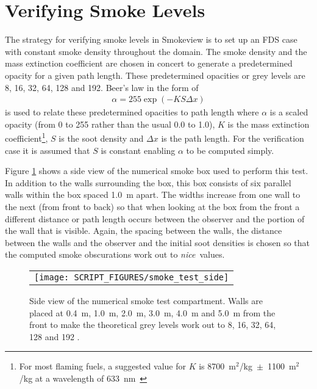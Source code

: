 \documentclass[11pt,twoside]{book}
\newcommand{\figoptions}{hbp}
\begin{document}
\section{Verifying Smoke Levels}
The strategy for verifying smoke levels in Smokeview is to set up an FDS case with constant smoke density throughout the domain.  The smoke density and the mass extinction coefficient are chosen in concert to generate a predetermined opacity for a given path length.   These predetermined opacities or grey levels are 8, 16, 32, 64, 128 and 192.  Beer's law in the form of
\begin{eqnarray*}
\alpha = 255\exp(-KS\Delta x)
\end{eqnarray*}
is used to relate these predetermined opacities to path length where $\alpha$ is a scaled opacity (from 0 to 255 rather than the usual 0.0 to 1.0),
$K$ is the mass extinction coefficient\footnote{For most flaming fuels, a suggested value for $K$ is
8700~m$^2$/kg~$\pm$~1100~m$^2$/kg at a
wavelength of 633~nm~\cite{Mulholland:F+M}},
$S$ is the soot density and $\Delta x$ is the path length.  For the verification case it is assumed that $S$ is constant enabling $\alpha$ to be computed simply.

Figure \ref{figsmoketestgeom} shows a side view of the numerical smoke box used to perform this test.  In addition to the walls surrounding the box, this box consists of  six parallel walls within the box spaced 1.0~m apart.  The widths increase from one wall to the next (from front to back) so that when looking at the box from the front a different distance or path length occurs between the observer and the portion of the wall that is visible.  Again, the spacing between the walls, the distance between the walls and the observer and the initial soot densities is chosen so that the computed smoke obscurations work out to {\em nice}\ values.

\begin{figure}[\figoptions]
\begin{center}
 \centering
\begin{tabular}{c}
 \texttt{[image: SCRIPT\_FIGURES/smoke\_test\_side]}
 \end{tabular}
\end{center}
 \caption[Side view of numerical smoke test compartment.]{Side view of the numerical smoke test compartment.  Walls are placed at 0.4~m, 1.0~m, 2.0~m, 3.0~m, 4.0~m and 5.0~m from the front to make the theoretical grey levels work out to 8, 16, 32, 64, 128 and 192 .}
\label{figsmoketestgeom}%
\end{figure}
\end{document}
